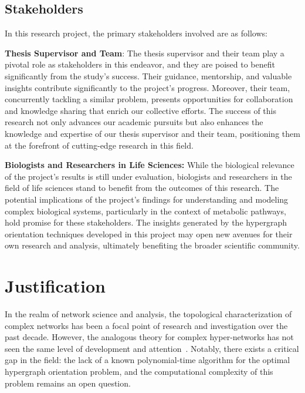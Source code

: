 \subsection{Stakeholders} \label{sec:stakeholders}

In this research project, the primary stakeholders involved are as follows:
\begin{list}{}{\leftmargin=0em}
\item \textbf{Thesis Supervisor and Team}: The thesis supervisor and their team play a pivotal role as stakeholders in this endeavor, and they are poised to benefit significantly from the study's success. Their guidance, mentorship, and valuable insights contribute significantly to the project's progress. Moreover, their team, concurrently tackling a similar problem, presents opportunities for collaboration and knowledge sharing that enrich our collective efforts. The success of this research not only advances our academic pursuits but also enhances the knowledge and expertise of our thesis supervisor and their team, positioning them at the forefront of cutting-edge research in this field.
\item \textbf{Biologists and Researchers in Life Sciences:} While the biological relevance of the project's results is still under evaluation, biologists and researchers in the field of life sciences stand to benefit from the outcomes of this research. The potential implications of the project's findings for understanding and modeling complex biological systems, particularly in the context of metabolic pathways, hold promise for these stakeholders. The insights generated by the hypergraph orientation techniques developed in this project may open new avenues for their own research and analysis, ultimately benefiting the broader scientific community.
\end{list}

\section{Justification}
In the realm of network science and analysis, the topological characterization of complex networks has been a focal point of research and investigation over the past decade. However, the analogous theory for complex hyper-networks has not seen the same level of development and attention~\cite{Pearcy.Crofts.Chuzhanova:2014}. Notably, there exists a critical gap in the field: the lack of a known polynomial-time algorithm for the optimal hypergraph orientation problem, and the computational complexity of this problem remains an open question.

